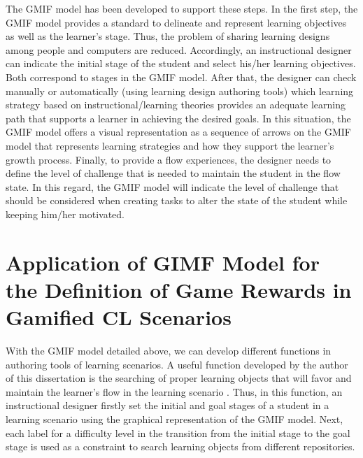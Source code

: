 The GMIF model has been developed to support these steps. In the first step, the GMIF model provides a standard to delineate and represent learning objectives as well as the learner’s stage.
Thus, the problem of sharing learning designs among people and computers are reduced. Accordingly, an instructional designer can indicate the initial stage of the student and select his/her learning objectives.
Both correspond to stages in the GMIF model.
After that, the designer can check manually or automatically (using learning design authoring tools) which learning strategy based on instructional/learning theories provides an adequate learning path that supports a learner in achieving the desired goals.
In this situation, the GMIF model offers a visual representation as a sequence of arrows on the GMIF model that represents learning strategies and how they support the learner’s growth process.
Finally, to provide a flow experiences, the designer needs to define the level of challenge that is needed to maintain the student in the flow state.
In this regard, the GMIF model will indicate the level of challenge that should be considered when creating tasks to alter the state of the student while keeping him/her motivated.

\section[Application of GIMF Model for the Definition of Game Rewards]{Application of GIMF Model for the Definition of Game Rewards in Gamified CL Scenarios}
\label{sec:application-giving-rewards-by-gimf-model}

With the GMIF model detailed above, we can develop different functions in authoring tools of learning scenarios.
A useful function developed by the author of this dissertation is the searching of proper learning objects that will favor and maintain the learner’s flow in the learning scenario \cite{ChallcoAndradeBorgesBittencourtIsotani2016}.
Thus, in this function, an instructional designer firstly set the initial and goal stages of a student in a learning scenario using the graphical representation of the GMIF model.
Next, each label for a difficulty level in the transition from the initial stage to the goal stage is used as a constraint to search learning objects from different repositories. 

